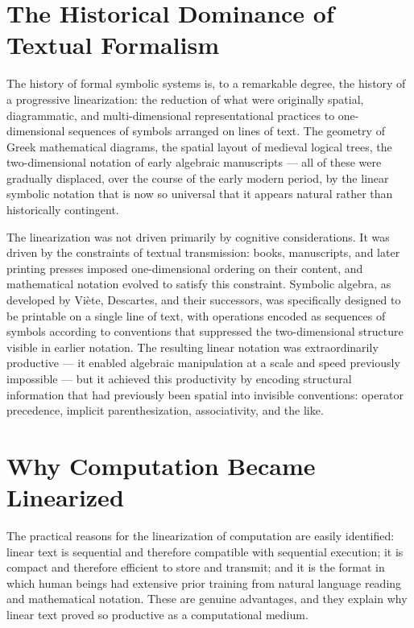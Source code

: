 \documentclass[12pt,openany]{book}
\theoremstyle{plain}
\theoremstyle{definition}
\theoremstyle{remark}
\begin{document}
\section{The Historical Dominance of Textual Formalism}

The history of formal symbolic systems is, to a remarkable degree, the history of a progressive linearization: the reduction of what were originally spatial, diagrammatic, and multi-dimensional representational practices to one-dimensional sequences of symbols arranged on lines of text. The geometry of Greek mathematical diagrams, the spatial layout of medieval logical trees, the two-dimensional notation of early algebraic manuscripts — all of these were gradually displaced, over the course of the early modern period, by the linear symbolic notation that is now so universal that it appears natural rather than historically contingent.

The linearization was not driven primarily by cognitive considerations. It was driven by the constraints of textual transmission: books, manuscripts, and later printing presses imposed one-dimensional ordering on their content, and mathematical notation evolved to satisfy this constraint. Symbolic algebra, as developed by Viète, Descartes, and their successors, was specifically designed to be printable on a single line of text, with operations encoded as sequences of symbols according to conventions that suppressed the two-dimensional structure visible in earlier notation. The resulting linear notation was extraordinarily productive — it enabled algebraic manipulation at a scale and speed previously impossible — but it achieved this productivity by encoding structural information that had previously been spatial into invisible conventions: operator precedence, implicit parenthesization, associativity, and the like.

\section{Why Computation Became Linearized}

The practical reasons for the linearization of computation are easily identified: linear text is sequential and therefore compatible with sequential execution; it is compact and therefore efficient to store and transmit; and it is the format in which human beings had extensive prior training from natural language reading and mathematical notation. These are genuine advantages, and they explain why linear text proved so productive as a computational medium.
\end{document}

